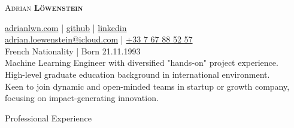 \documentclass{article}
\newcommand{\namesection}[4]{
	\begin{center}
		\sffamily \color{headings}
		\headingfont\fontsize{35pt}{14pt}\selectfont\scshape #1 
			\headingfont\selectfont\scshape\bfseries #2
	\end{center}
	\vspace{-14pt}
		\begin{center} \color{subheadings}\normalfont\fontsize{11pt}{14pt}\selectfont #3
		\end{center}
	
	\vspace{-5pt}
	}
\begin{document}

\namesection{Adrian}{Löwenstein}{\href{https://www.adrianlwn.com}{\faGlobe{} adrianlwn.com} | \href{https://github.com/adrianlwn}{\faGithubSquare{}  github}  | \href{https://www.linkedin.com/in/adrianloewenstein}{\faLinkedinSquare{}  linkedin} \\ \href{mailto:adrian.loewenstein@icloud.com}{\faEnvelope{} adrian.loewenstein@icloud.com} |  \href{tel:+33767885257}{\faPhoneSquare{} +33 7 67 88 52 57}  \\ French Nationality | Born 21.11.1993 \\[6pt] Machine Learning Engineer with diversified "hands-on" project experience.\\ High-level graduate education background in international environment.\\ Keen to join dynamic and open-minded teams in startup or growth company, \\ focusing on impact-generating innovation.}

\section{Professional Experience}
\end{document}
